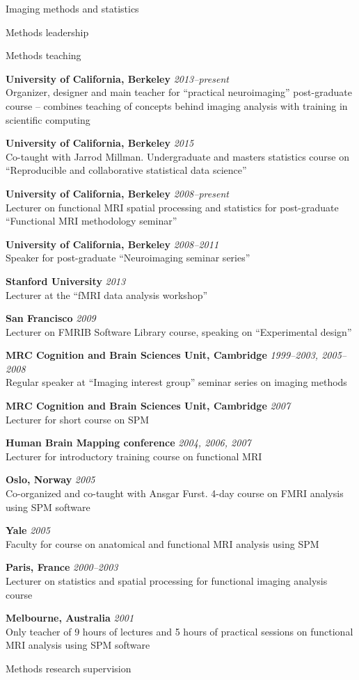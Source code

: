\documentclass{cv}
\newcommand{\PlaceDateNote}[3]{{\bf #1} \hfill {\em #2} \\#3}
\newcommand{\UCB}{University of California, Berkeley}
\newcommand{\CBU}{MRC Cognition and Brain Sciences Unit, Cambridge}
\begin{document}
\begin{cvSection}{Imaging methods and statistics}
\begin{cvSubSection}{Methods leadership}
\end{cvSubSection}

\begin{cvSubSection}{Methods teaching}

\PlaceDateNote{\UCB}{2013--present}
{Organizer, designer and main teacher for ``practical neuroimaging''
post-graduate course -- combines teaching of concepts behind imaging analysis
with training in scientific computing}

\PlaceDateNote{\UCB}{2015}
{Co-taught with Jarrod Millman.  Undergraduate and masters statistics course
on ``Reproducible and collaborative statistical data science''}

\PlaceDateNote{\UCB}{2008--present}
{Lecturer on functional MRI spatial processing and statistics for
post-graduate ``Functional MRI methodology seminar''}

\PlaceDateNote{\UCB}{2008--2011}
{Speaker for post-graduate ``Neuroimaging seminar series''}

\PlaceDateNote{Stanford University}{2013}
{Lecturer at the ``fMRI data analysis workshop''}

\PlaceDateNote{San Francisco}{2009}
{Lecturer on FMRIB Software Library course, speaking on ``Experimental
design''}

\PlaceDateNote{\CBU}{1999--2003, 2005--2008}
{Regular speaker at ``Imaging interest group'' seminar series on imaging
methods}

\PlaceDateNote{\CBU}{2007}
{Lecturer for short course on SPM}

\PlaceDateNote{Human Brain Mapping conference}{2004, 2006, 2007}
{Lecturer for introductory training course on functional MRI}

\PlaceDateNote{Oslo, Norway}{2005}
{Co-organized and co-taught with Ansgar Furst. 4-day course on FMRI analysis
using SPM software}

\PlaceDateNote{Yale}{2005}
{Faculty for course on anatomical and functional MRI analysis using SPM}

\PlaceDateNote{Paris, France}{2000--2003}
{Lecturer on statistics and spatial processing for functional imaging analysis
course}

\PlaceDateNote{Melbourne, Australia}{2001}
{Only teacher of 9 hours of lectures and 5 hours of practical sessions on
functional MRI analysis using SPM software}

\end{cvSubSection}

\begin{cvSubSection}{Methods research supervision}


\end{cvSubSection}
\end{cvSection}
\end{document}

